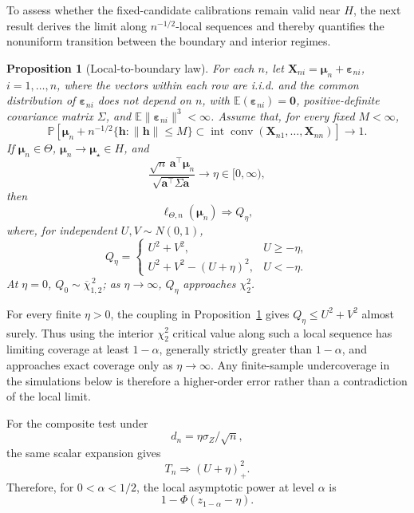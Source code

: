 \documentclass[11pt]{article}
\newtheorem{proposition}[theorem]{Proposition}
\theoremstyle{remark}
\newcommand{\E}{\mathbb{E}}
\newcommand{\Pp}{\mathbb{P}}
\newcommand{\conv}{\operatorname{conv}}
\newcommand{\interior}{\operatorname{int}}
\newcommand{\barchi}[2]{\overline{\chi}^{\,2}_{#1,#2}}
\begin{document}
To assess whether the fixed-candidate calibrations remain valid near $H$, the next result derives the limit along $n^{-1/2}$-local sequences and thereby quantifies the nonuniform transition between the boundary and interior regimes.

\begin{proposition}[Local-to-boundary law]\label{prop:local}
For each $n$, let $\boldsymbol{X}_{ni}=\boldsymbol{\mu}_n+\boldsymbol{\varepsilon}_{ni}$, $i=1,\ldots,n$, where the vectors within each row are i.i.d. and the common distribution of $\boldsymbol{\varepsilon}_{ni}$ does not depend on $n$, with $\E(\boldsymbol{\varepsilon}_{ni})=\boldsymbol{0}$, positive-definite covariance matrix $\Sigma$, and $\E\|\boldsymbol{\varepsilon}_{ni}\|^3<\infty$. Assume that, for every fixed $M<\infty$,
$$
  \Pp\left[
  \boldsymbol{\mu}_n+n^{-1/2}\{\boldsymbol{h}:\|\boldsymbol{h}\|\leq M\}
  \subset\interior\conv(\boldsymbol{X}_{n1},\ldots,\boldsymbol{X}_{nn})
  \right]\to1.
$$
If $\boldsymbol{\mu}_n\in\Theta$, $\boldsymbol{\mu}_n\to\boldsymbol{\mu}_\star\in H$, and
$$
  \frac{\sqrt n\,\boldsymbol{a}^\top\boldsymbol{\mu}_n}
       {\sqrt{\boldsymbol{a}^\top\Sigma\boldsymbol{a}}}
  \longrightarrow \eta\in[0,\infty),
$$
then
$$
  \ell_{\Theta,n}(\boldsymbol{\mu}_n)\Rightarrow Q_\eta,
$$
where, for independent $U,V\sim N(0,1)$,
$$
  Q_\eta
  =
  \begin{cases}
    U^2+V^2,&U\geq-\eta,\\[2mm]
    U^2+V^2-(U+\eta)^2,&U<-\eta.
  \end{cases}
$$
At $\eta=0$, $Q_0\sim\barchi{1}{2}$; as $\eta\to\infty$, $Q_\eta$ approaches $\chi^2_2$.
\end{proposition}

For every finite $\eta>0$, the coupling in Proposition~\ref{prop:local} gives $Q_\eta\leq U^2+V^2$ almost surely. Thus using the interior $\chi^2_2$ critical value along such a local sequence has limiting coverage at least $1-\alpha$, generally strictly greater than $1-\alpha$, and approaches exact coverage only as $\eta\to\infty$. Any finite-sample undercoverage in the simulations below is therefore a higher-order error rather than a contradiction of the local limit.

For the composite test under
$$
  d_n=\eta\sigma_Z/\sqrt n,
$$
the same scalar expansion gives
$$
  T_n\Rightarrow(U+\eta)_+^2.
$$
Therefore, for $0<\alpha<1/2$, the local asymptotic power at level $\alpha$ is
\begin{equation}\label{eq:local-power}
  1-\Phi(z_{1-\alpha}-\eta).
\end{equation}
\end{document}
